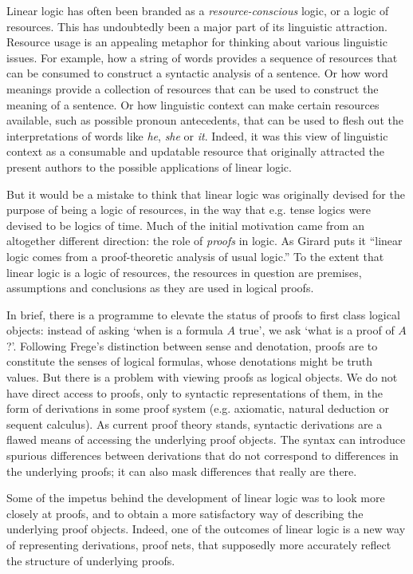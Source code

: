Linear logic has often been branded as a {\em resource-conscious}
logic, or a logic of resources.  This has undoubtedly been a major
part of its linguistic attraction.  Resource usage is an appealing
metaphor for thinking about various linguistic issues.  For example,
how a string of words provides a sequence of resources that can
be consumed to construct a syntactic analysis of a sentence.  Or
how word meanings provide a collection of resources that can be
used to construct the meaning of a sentence.  Or how linguistic
context can make certain resources available, such as possible pronoun
antecedents, that can be used to flesh out the interpretations of
words like {\it he}, {\it she} or {\it it}.  Indeed, it was this view
of linguistic context as a consumable and updatable resource that
originally attracted the present authors to the possible
applications of linear logic.

But it would be a mistake to think that linear logic was originally
devised for the purpose of being a logic of resources, in the way
that e.g. tense logics were devised to be logics of time.  Much
of the initial motivation came from an altogether different direction:
the role of {\em proofs} in logic.  
As Girard puts it  ``linear logic comes from a proof-theoretic
analysis of usual logic.'' To the extent that linear logic is
a logic of resources, the resources in question are premises,
assumptions and conclusions as they are used in logical proofs.

In brief, there is a programme to elevate the status of proofs to first class
logical objects: instead of asking `when is a formula $A$ true', we ask
`what is a proof of $A$?'.  Following Frege's distinction between
sense and denotation, proofs are to constitute the senses of logical
formulas, whose denotations might be truth values.  But there is a problem
with viewing proofs as logical objects.  We do not have direct access
to proofs, only to syntactic representations of them, in the form of
derivations in some proof system (e.g. axiomatic, natural
deduction or sequent calculus).  As current proof theory stands,
syntactic derivations are a flawed means of accessing the underlying
proof objects.  The syntax can introduce spurious differences between
derivations that do not correspond to differences in the underlying
proofs; it can also mask differences that really are there.

Some of the impetus behind the development of linear logic was to look
more closely at proofs, and to obtain a more satisfactory way of
describing the underlying proof objects.  Indeed, one of the outcomes
of linear logic is a new way of representing derivations, proof nets,
that supposedly more accurately reflect the structure of underlying
proofs.


